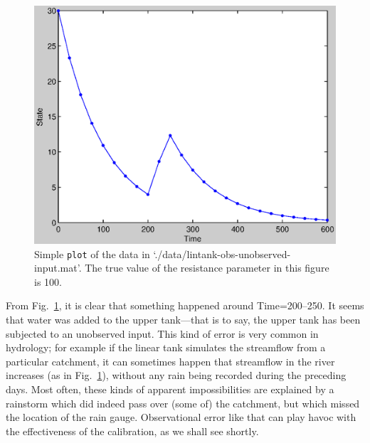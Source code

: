 


\begin{figure}[htb]
  \centering
    \includegraphics[width=\linewidth,keepaspectratio]{./../eps/lintank-obs-unobserved-input.eps}
  \caption{Simple \texttt{plot} of the data in `./data/lintank-obs-unobserved-input.mat'. The true value of the resistance parameter in this figure is 100.}
  \label{fig:lintank-obs-unobserved-input}
\end{figure}

From Fig.~\ref{fig:lintank-obs-unobserved-input}, it is clear that something happened around Time=200--250. It seems that water was added to the upper tank---that is to say, the upper tank has been subjected to an unobserved input. This kind of error is very common in hydrology; for example if the linear tank simulates the streamflow from a particular catchment, it can sometimes happen that streamflow in the river increases (as in Fig.~\ref{fig:lintank-obs-unobserved-input}), without any rain being recorded during the preceding days. Most often, these kinds of apparent impossibilities are explained by a rainstorm which did indeed pass over (some of) the catchment, but which missed the location of the rain gauge. Observational error like that can play havoc with the effectiveness of the calibration, as we shall see shortly.

